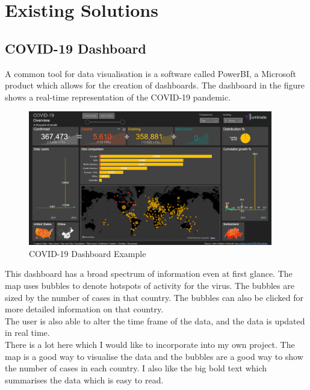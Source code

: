 \documentclass{report}
\begin{document}
\section{Existing Solutions}
\subsection{COVID-19 Dashboard}
A common tool for data visualisation is a software called PowerBI, a Microsoft product which allows for the creation of dashboards. 
The dashboard in the figure shows a real-time representation of the COVID-19 pandemic.
\begin{center}
    \begin{figure}[h]
        \centering
        \includegraphics[width=0.95\textwidth]{PowerBI Example.png}
        \caption{COVID-19 Dashboard Example \cite{Badr2023}}
        \label{fig:covid19_dashboard}
    \end{figure}
\end{center}
This dashboard has a broad spectrum of information even at first glance. The map uses bubbles to denote hotspots of activity for the virus. The bubbles are sized by the number of cases in that country. The bubbles can also be clicked for more detailed information on that country. \\
The user is also able to alter the time frame of the data, and the data is updated in real time.\\
There is a lot here which I would like to incorporate into my own project. The map is a good way to visualise the data and the bubbles are a good way to show the number of cases in each country. I also like the big bold text which summarises the data which is easy to read.\\
\newpage
\end{document}
